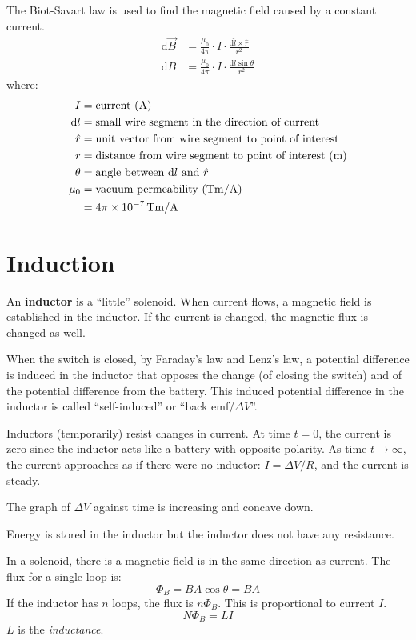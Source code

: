 \documentclass{article}
\newcommand{\theorem}[2]{\begin{tcolorbox}[title={#1},colback=blue!5!white,colframe=blue!75!black,parbox=false] #2 \end{tcolorbox}}
\begin{document}
\theorem{Biot-Savart law}{
	The Biot-Savart law is used to find the magnetic field caused by a constant current.
	\begin{align*}
	    \mathrm{d}\vec B
		&=\frac{\mu_0}{4\pi}\cdot I\cdot \frac{\mathrm{d}\hat l\times \hat r}{r^2} \\
	    \mathrm{d}B
		&=\frac{\mu_0}{4\pi}\cdot I\cdot \frac{\mathrm{d}l\sin\theta}{r^2}
	\end{align*}
	where:
	\begin{align*}
		I&=\text{current (A)} \\
		\mathrm{d}l&=\text{small wire segment in the direction of current} \\
		\hat r&=\text{unit vector from wire segment to point of interest} \\
		r&=\text{distance from wire segment to point of interest (m)} \\
		\theta&=\text{angle between $\mathrm{d}l$ and $\hat r$} \\
		\mu_0
		&=\text{vacuum permeability (\si{Tm/A})} \\
		&=4\pi\times 10^{-7}\,\si{Tm/A}
	\end{align*}
}

\section{Induction}

An \textbf{inductor} is a ``little'' solenoid. When current flows, a magnetic field is established in the inductor. If the current is changed, the magnetic flux is changed as well.

When the switch is closed, by Faraday's law and Lenz's law, a potential difference is induced in the inductor that opposes the change (of closing the switch) and of the potential difference from the battery. This induced potential difference in the inductor is called ``self-induced'' or ``back emf/$\Delta V$''.

Inductors (temporarily) resist changes in current. At time $t=0$, the current is zero since the inductor acts like a battery with opposite polarity. As time $t\to\infty$, the current approaches as if there were no inductor: $I=\Delta V/R$, and the current is steady.

The graph of $\Delta V$ against time is increasing and concave down.

Energy is stored in the inductor but the inductor does not have any resistance.

In a solenoid, there is a magnetic field is in the same direction as current. The flux for a single loop is:
\begin{equation*}
    \Phi_B=BA\cos\theta=BA
\end{equation*}
If the inductor has $n$ loops, the flux is $n\Phi_B$. This is proportional to current $I$.
\begin{equation*}
    N\Phi_B=LI
\end{equation*}
$L$ is the \textit{inductance}.
\end{document}
